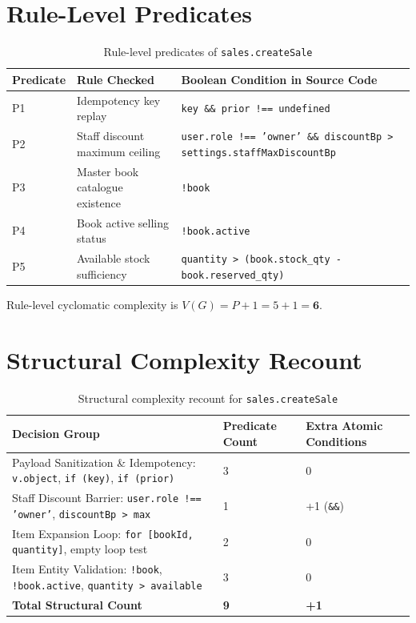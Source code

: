 \documentclass[12pt, a4paper]{report}
\begin{document}
\section{Rule-Level Predicates}
\begin{table}[H]
\centering
\footnotesize
\begin{tabularx}{\textwidth}{L{1.8cm} L{4.5cm} L{9.0cm}}
\toprule
\textbf{Predicate} & \textbf{Rule Checked} & \textbf{Boolean Condition in Source Code} \\
\midrule
P1 & Idempotency key replay & \texttt{key \&\& prior !== undefined} \\
P2 & Staff discount maximum ceiling & \texttt{user.role !== 'owner' \&\& discountBp > settings.staffMaxDiscountBp} \\
P3 & Master book catalogue existence & \texttt{!book} \\
P4 & Book active selling status & \texttt{!book.active} \\
P5 & Available stock sufficiency & \texttt{quantity > (book.stock\_qty - book.reserved\_qty)} \\
\bottomrule
\end{tabularx}
\caption{Rule-level predicates of \texttt{sales.createSale}}
\label{tab:predicates_2}
\end{table}

Rule-level cyclomatic complexity is $V(G) = P + 1 = 5 + 1 = \mathbf{6}$.

\section{Structural Complexity Recount}
\begin{table}[H]
\centering
\footnotesize
\begin{tabularx}{\textwidth}{L{7.5cm} C{3.0cm} C{4.5cm}}
\toprule
\textbf{Decision Group} & \textbf{Predicate Count} & \textbf{Extra Atomic Conditions} \\
\midrule
Payload Sanitization \& Idempotency: \texttt{v.object}, \texttt{if (key)}, \texttt{if (prior)} & 3 & 0 \\
Staff Discount Barrier: \texttt{user.role !== 'owner'}, \texttt{discountBp > max} & 1 & +1 (\texttt{\&\&}) \\
Item Expansion Loop: \texttt{for [bookId, quantity]}, empty loop test & 2 & 0 \\
Item Entity Validation: \texttt{!book}, \texttt{!book.active}, \texttt{quantity > available} & 3 & 0 \\
\midrule
\textbf{Total Structural Count} & \textbf{9} & \textbf{+1} \\
\bottomrule
\end{tabularx}
\caption{Structural complexity recount for \texttt{sales.createSale}}
\label{tab:recount_2}
\end{table}
\end{document}
